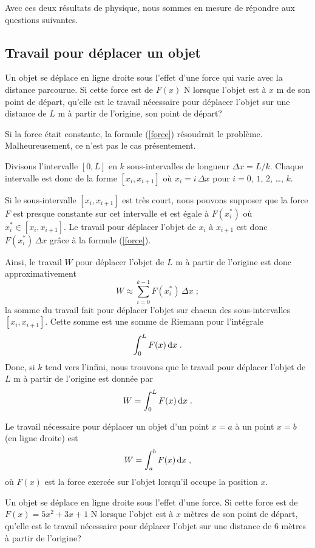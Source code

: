 {Avec ces deux résultats de physique, nous sommes en mesure de répondre aux
questions suivantes.

\subsection{Travail pour déplacer un objet}

Un objet se déplace en ligne droite sous l'effet d'une force qui varie
avec la distance parcourue.  Si cette force est de $F(x)$ N lorsque
l'objet est à $x$ m de son point de départ, qu'elle est le travail
nécessaire pour déplacer l'objet sur une distance de $L$ m à partir de
l'origine, son point de départ? 

Si la force était constante, la formule (\ref{force}) résoudrait le
problème.  Malheureusement, ce n'est pas le cas présentement.

Divisons l'intervalle $[0,L]$ en $k$ sous-intervalles de longueur
$\Delta x = L/k$.  Chaque intervalle est donc de la forme $[x_i,x_{i+1}]$ où
$x_i= i\,\Delta x$ pour $i=0$, $1$, $2$, \ldots, $k$.

Si le sous-intervalle $[x_i,x_{i+1}]$ est très court, nous pouvons supposer
que la force $F$ est presque constante sur cet intervalle et est égale
à $F(x_i^\ast)$ où $x_i^\ast \in [x_i,x_{i+1}]$.  Le travail pour
déplacer l'objet de $x_i$ à $x_{i+1}$ est donc $F(x_i^\ast)\,\Delta x$
grâce à la formule (\ref{force}).

Ainsi, le travail $W$ pour déplacer l'objet de $L$ m à partir de
l'origine est donc approximativement
\[
W \approx \sum_{i=0}^{k-1} F(x_i^\ast) \, \Delta x  \; ;
\]
la somme du travail fait pour déplacer l'objet sur chacun des
sous-intervalles $[x_i,x_{i+1}]$.  Cette somme est une somme de Riemann pour
l'intégrale
\[
\int_0^L F(x) \,\mathrm{d}x \; .
\]
Donc, si $k$ tend vers l'infini, nous trouvons que le travail pour déplacer
l'objet de $L$ m à partir de l'origine est donnée par
\[
W = \int_0^L F(x) \,\mathrm{d}x \; .
\]

\begin{focus}{\mth} 
Le travail nécessaire pour déplacer un objet d'un point $x=a$ à un
point $x=b$ (en ligne droite) est
\[
W = \int_a^b F(x) \,\mathrm{d}x \; ,
\]
où $F(x)$ est la force exercée sur l'objet lorsqu'il occupe la
position $x$.
\end{focus}

\begin{egg}
Un objet se déplace en ligne droite sous l'effet d'une force.  Si cette force
est de $F(x) = 5x^2 +3x+1$ N lorsque l'objet est à $x$ mètres de son point de
départ, qu'elle est le travail nécessaire pour déplacer l'objet sur une
distance de $6$ mètres à partir de l'origine?


\end{egg}}
